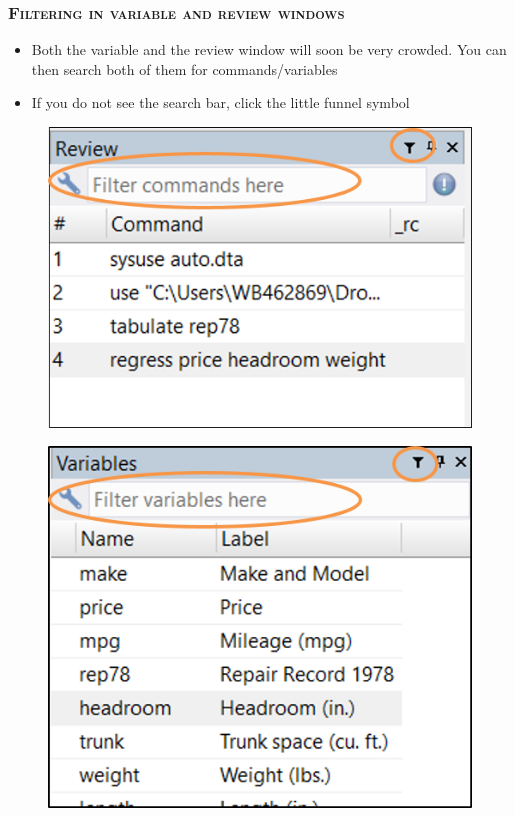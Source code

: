 \documentclass[10pt]{beamer}
\begin{document}
	\begin{frame}
		\frametitle{\textsc{Filtering in variable and review windows}}
	\begin{minipage}{0.45\linewidth}
		\begin{itemize}
			\item  Both the variable and the review window will soon be very crowded. You can then search both of them for commands/variables
			
			\item  If you do not see the search bar, click the little funnel symbol
			
			
		\end{itemize}
	\end{minipage}
 	\hfill
	\begin{minipage}{0.45\linewidth}
		\begin{figure}[H] 
			\centering
			\includegraphics[width=0.75\linewidth]{review_window}
		\end{figure}
		\begin{figure}[H] 
			\centering
			\includegraphics[width=0.75\linewidth]{variable_window}
		\end{figure}
	\end{minipage}
	\end{frame}
\end{document}
